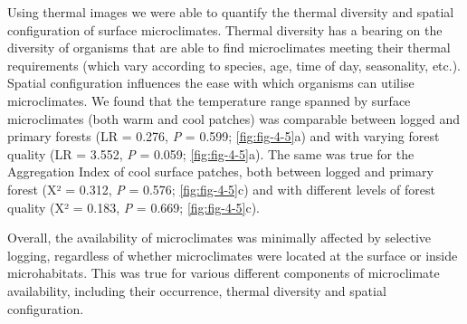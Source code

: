 \documentclass[12pt,a4paper,]{report}
\theoremstyle{definition}
\theoremstyle{definition}
\theoremstyle{definition}
\theoremstyle{remark}
\begin{document}
Using thermal images we were able to quantify the thermal diversity and
spatial configuration of surface microclimates. Thermal diversity has a
bearing on the diversity of organisms that are able to find
microclimates meeting their thermal requirements (which vary according
to species, age, time of day, seasonality, etc.). Spatial configuration
influences the ease with which organisms can utilise microclimates. We
found that the temperature range spanned by surface microclimates (both
warm and cool patches) was comparable between logged and primary forests
(LR = 0.276, \emph{P} = 0.599; \autoref{fig:fig-4-5}a) and with varying
forest quality (LR = 3.552, \emph{P} = 0.059; \autoref{fig:fig-4-5}a).
The same was true for the Aggregation Index of cool surface patches,
both between logged and primary forest (Χ² = 0.312, \emph{P} = 0.576;
\autoref{fig:fig-4-5}c) and with different levels of forest quality (Χ²
= 0.183, \emph{P} = 0.669; \autoref{fig:fig-4-5}c).

Overall, the availability of microclimates was minimally affected by
selective logging, regardless of whether microclimates were located at
the surface or inside microhabitats. This was true for various different
components of microclimate availability, including their occurrence,
thermal diversity and spatial configuration.
\end{document}
